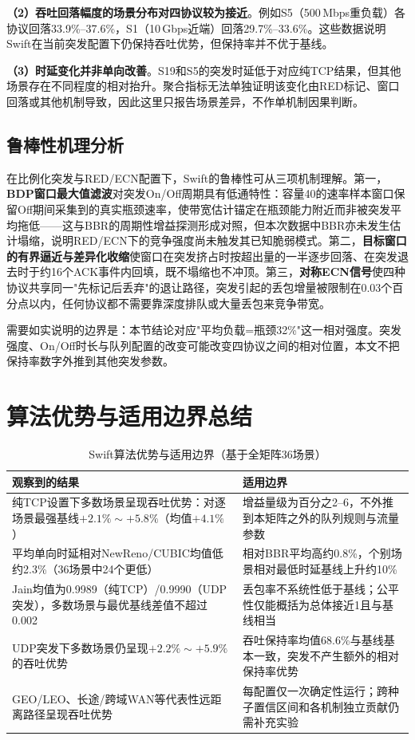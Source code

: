 \textbf{（2）吞吐回落幅度的场景分布对四协议较为接近}。例如S5（500\,Mbps重负载）各协议回落33.9\%--37.6\%，S1（10\,Gbps近端）回落29.7\%--33.6\%。这些数据说明Swift在当前突发配置下仍保持吞吐优势，但保持率并不优于基线。

\textbf{（3）时延变化并非单向改善}。S19和S5的突发时延低于对应纯TCP结果，但其他场景存在不同程度的相对抬升。聚合指标无法单独证明该变化由RED标记、窗口回落或其他机制导致，因此这里只报告场景差异，不作单机制因果判断。

\subsection{鲁棒性机理分析}

在比例化突发与RED/ECN配置下，Swift的鲁棒性可从三项机制理解。第一，\textbf{BDP窗口最大值滤波}对突发On/Off周期具有低通特性：容量40的速率样本窗口保留Off期间采集到的真实瓶颈速率，使带宽估计锚定在瓶颈能力附近而非被突发平均拖低——这与BBR的周期性增益探测形成对照，但本次数据中BBR亦未发生估计塌缩，说明RED/ECN下的竞争强度尚未触发其已知脆弱模式。第二，\textbf{目标窗口的有界逼近与差异化收缩}使窗口在突发挤占时按超出量的一半逐步回落、在突发退去时于约16个ACK事件内回填，既不塌缩也不冲顶。第三，\textbf{对称ECN信号}使四种协议共享同一"先标记后丢弃"的退让路径，突发引起的丢包增量被限制在0.03个百分点以内，任何协议都不需要靠深度排队或大量丢包来竞争带宽。

需要如实说明的边界是：本节结论对应"平均负载=瓶颈32\%"这一相对强度。突发强度、On/Off时长与队列配置的改变可能改变四协议之间的相对位置，本文不把保持率数字外推到其他突发参数。

\section{算法优势与适用边界总结}

\begin{table}[htbp]
\centering
\caption{Swift算法优势与适用边界（基于全矩阵36场景）}
\label{tab:pros_cons}
\small
\begin{tabular}{|p{6.4cm}|p{6.4cm}|}
\hline
\textbf{观察到的结果} & \textbf{适用边界} \\
\hline
纯TCP设置下多数场景呈现吞吐优势：对逐场景最强基线$+2.1\%\sim+5.8\%$（均值$+4.1\%$） & 增益量级为百分之2--6，不外推到本矩阵之外的队列规则与流量参数 \\
平均单向时延相对NewReno/CUBIC均值低约2.3\%（36场景中24个更低） & 相对BBR平均高约0.8\%，个别场景相对最低时延基线上升约10\% \\
Jain均值为0.9989（纯TCP）/0.9990（UDP突发），多数场景与最优基线差值不超过0.002 & 丢包率不系统性低于基线；公平性仅能概括为总体接近1且与基线相当 \\
UDP突发下多数场景仍呈现$+2.2\%\sim+5.9\%$的吞吐优势 & 吞吐保持率均值68.6\%与基线基本一致，突发不产生额外的相对保持率优势 \\
GEO/LEO、长途/跨域WAN等代表性远距离路径呈现吞吐优势 & 每配置仅一次确定性运行；跨种子置信区间和各机制独立贡献仍需补充实验 \\
\hline
\end{tabular}
\end{table}

